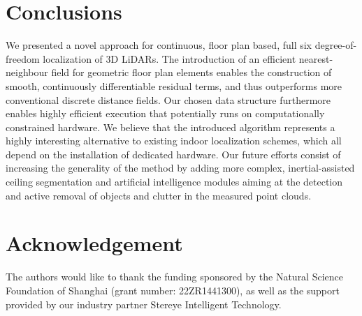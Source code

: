 \documentclass[letterpaper, 10 pt, conference]{ieeeconf}  %
\begin{document}

\section{Conclusions}

We presented a novel approach for continuous, floor plan based, full six degree-of-freedom localization of 3D LiDARs. The introduction of an efficient nearest-neighbour field for geometric floor plan elements enables the construction of smooth, continuously differentiable residual terms, and thus outperforms more conventional discrete distance fields. Our chosen data structure furthermore enables highly efficient execution that potentially runs on computationally constrained hardware. We believe that the introduced algorithm represents a highly interesting alternative to existing indoor localization schemes, which all depend on the installation of dedicated hardware. Our future efforts consist of increasing the generality of the method by adding more complex, inertial-assisted ceiling segmentation and artificial intelligence modules aiming at the detection and active removal of objects and clutter in the measured point clouds.

\section*{Acknowledgement}

The authors would like to thank the funding sponsored by the Natural Science Foundation of Shanghai (grant number: 22ZR1441300), as well as the support provided by our industry partner Stereye Intelligent Technology.


\addtolength{\textheight}{-8.4cm} %

\end{document}
